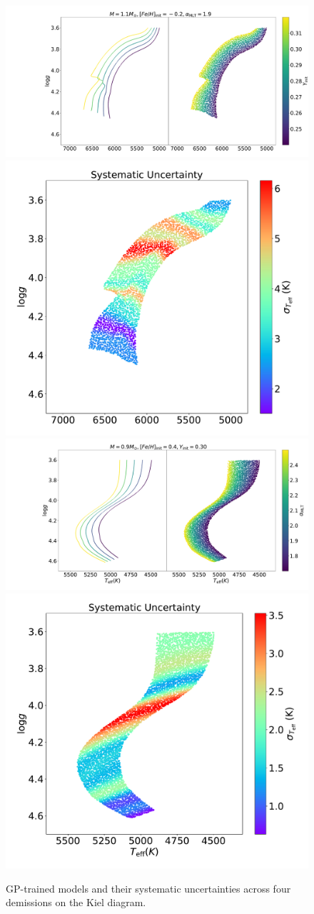 \begin{figure}
	\includegraphics[width=1.2\columnwidth]{5d-au-y.pdf}
	\includegraphics[width=0.65\columnwidth]{5d-au-y-sys.pdf}
	\includegraphics[width=1.2\columnwidth]{5d-au-alpha.pdf}
	\includegraphics[width=0.65\columnwidth]{5d-au-alpha-sys.pdf}
    \caption{GP-trained models and their systematic uncertainties across four demissions on the Kiel diagram.} 
  \label{fig:5d_augmentation}
\end{figure}

